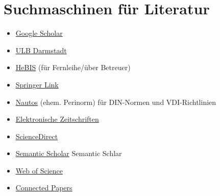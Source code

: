 \section{Suchmaschinen für Literatur}
\label{sec:suchmasch}
\begin{sloppypar}

\begin{itemize}
    \item \href{http://scholar.google.de}{Google Scholar}
    \item \href{http://dakapo.ulb.tu-darmstadt.de/servlet/Top/searchadvanced}{ULB Darmstadt}
    \item \href{http://www.portal.hebis.de/servlet/Top/searchadvanced}{HeBIS} (für Fernleihe/über Betreuer)
    \item \href{https://link.springer.com/}{Springer Link}
    \item \href{https://www.ulb.tu-darmstadt.de/finden_nutzen/recherchieren/normen_richtlinien.de.jsp}{Nautos} (ehem. Perinorm) für DIN-Normen und VDI-Richtlinien
    \item \href{http://rzblx1.uni-regensburg.de/ezeit/}{Elektronische Zeitschriften}
    \item \href{http://www.sciencedirect.com/science/journals}{ScienceDirect}
    \item \href{https://www.semanticscholar.org/}{Semantic Scholar} Semantic Schlar 
    \item \href{https://www.webofscience.com/wos/woscc/basic-search}{Web of Science}
    \item \href{https://www.connectedpapers.com/}{Connected Papers}
\end{itemize}


\end{sloppypar}

